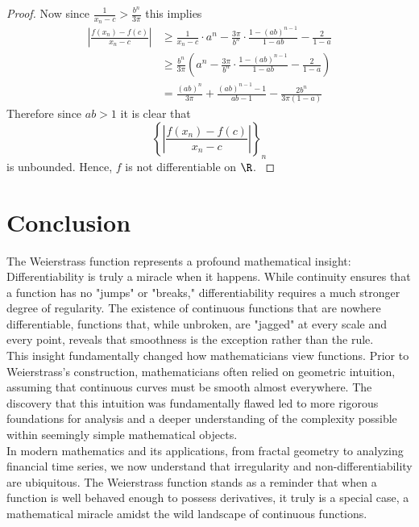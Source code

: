 \documentclass[fontsize=14pt]{scrartcl}
\begin{document}
\begin{proof}
    Now since $\frac{1}{x_n - c} > \frac{b^n}{3\pi}$ this implies
    \begin{equation}
    \begin{aligned}
        \left| \frac{f(x_n)-f(c)}{x_n - c} \right| &\geq \frac{1}{x_n - c} \cdot a^n - \frac{3\pi}{b^n} \cdot \frac{1-(ab)^{n-1}}{1-ab} - \frac{2}{1-a} \\
        &\geq \frac{b^n}{3\pi} ( a^n - \frac{3\pi}{b^n} \cdot \frac{1-(ab)^{n-1}}{1-ab} - \frac{2}{1-a})\\
        &= \frac{(ab)^n}{3\pi} + \frac{(ab)^{n-1}-1}{ab-1} - \frac{2b^n}{3\pi(1-a)}
    \end{aligned}
    \end{equation}
    Therefore since $ab>1$ it is clear that
    \begin{equation}
        \left\{\left| \frac{f(x_n)-f(c)}{x_n - c} \right|\right\}_n
    \end{equation}
    is unbounded. Hence, $f$ is not differentiable on $\R$.
    \cite{MITRealAnalysisLecture18}
\end{proof}

\section{Conclusion}

The Weierstrass function represents a profound mathematical insight: Differentiability is truly a miracle when it happens. While continuity ensures that a function has no "jumps" or "breaks," differentiability requires a much stronger degree of regularity. The existence of continuous functions that are nowhere differentiable, functions that, while unbroken, are "jagged" at every scale and every point, reveals that smoothness is the exception rather than the rule. \\

This insight fundamentally changed how mathematicians view functions. Prior to Weierstrass's construction, mathematicians often relied on geometric intuition, assuming that continuous curves must be smooth almost everywhere. The discovery that this intuition was fundamentally flawed led to more rigorous foundations for analysis and a deeper understanding of the complexity possible within seemingly simple mathematical objects. \\

In modern mathematics and its applications, from fractal geometry to analyzing financial time series, we now understand that irregularity and non-differentiability are ubiquitous. The Weierstrass function stands as a reminder that when a function is well behaved enough to possess derivatives, it truly is a special case, a mathematical miracle amidst the wild landscape of continuous functions.


\newpage

\end{document}
